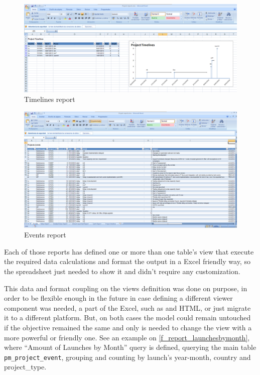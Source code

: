 \begin{figure}[ht!]
	\centering
   	\includegraphics[width=1\textwidth]{./resources/report_timelines.png}
   	\caption{Timelines report}
   	\label{f_report_timelines}
\end{figure}
\begin{figure}[ht!]
	\centering
   	\includegraphics[width=1\textwidth]{./resources/report_events.png}
   	\caption{Events report}
   	\label{f_report_events}
\end{figure}

Each of those reports has defined one or more than one table's view that execute
the required data calculations and format the output in a Excel friendly way, so
the spreadsheet just needed to show it and didn't require any customization. 

This data and format coupling on the views definition was done on purpose,
in order to be flexible enough in the future in case defining a different viewer
component was needed, a part of the Excel, such as and HTML, or just migrate it
to a different platform. But, on both cases the model could remain untouched if
the objective remained the same and only is needed to change the  view with a
more powerful or friendly one. See an example on
\ref{f_report_launchesbymonth}, where ``Amount of Launches by Month'' query 
is defined, querying the main table \texttt{pm\_project\_event}, grouping and
counting by launch's year-month, country and project\_type.


